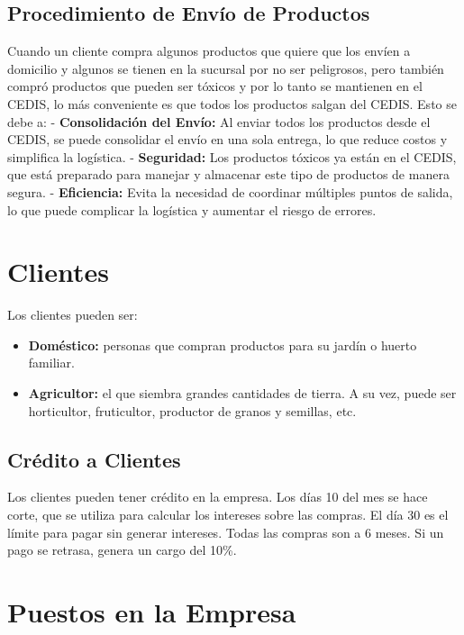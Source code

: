 \documentclass[
  letterpaper,
  DIV=11,
  numbers=noendperiod]{scrreprt}
\providecommand{\tightlist}{%
  \setlength{\itemsep}{0pt}\setlength{\parskip}{0pt}}\usepackage{longtable,booktabs,array}
\begin{document}
\subsection{Procedimiento de Envío de
Productos}\label{procedimiento-de-envuxedo-de-productos}

Cuando un cliente compra algunos productos que quiere que los envíen a
domicilio y algunos se tienen en la sucursal por no ser peligrosos, pero
también compró productos que pueden ser tóxicos y por lo tanto se
mantienen en el CEDIS, lo más conveniente es que todos los productos
salgan del CEDIS. Esto se debe a: - \textbf{Consolidación del Envío:} Al
enviar todos los productos desde el CEDIS, se puede consolidar el envío
en una sola entrega, lo que reduce costos y simplifica la logística. -
\textbf{Seguridad:} Los productos tóxicos ya están en el CEDIS, que está
preparado para manejar y almacenar este tipo de productos de manera
segura. - \textbf{Eficiencia:} Evita la necesidad de coordinar múltiples
puntos de salida, lo que puede complicar la logística y aumentar el
riesgo de errores.

\section{Clientes}\label{clientes}

Los clientes pueden ser:

\begin{itemize}
\tightlist
\item
  \textbf{Doméstico:} personas que compran productos para su jardín o
  huerto familiar.
\item
  \textbf{Agricultor:} el que siembra grandes cantidades de tierra. A su
  vez, puede ser horticultor, fruticultor, productor de granos y
  semillas, etc.
\end{itemize}

\subsection{Crédito a Clientes}\label{cruxe9dito-a-clientes}

Los clientes pueden tener crédito en la empresa. Los días 10 del mes se
hace corte, que se utiliza para calcular los intereses sobre las
compras. El día 30 es el límite para pagar sin generar intereses. Todas
las compras son a 6 meses. Si un pago se retrasa, genera un cargo del
10\%.

\section{Puestos en la Empresa}\label{puestos-en-la-empresa}
\end{document}
